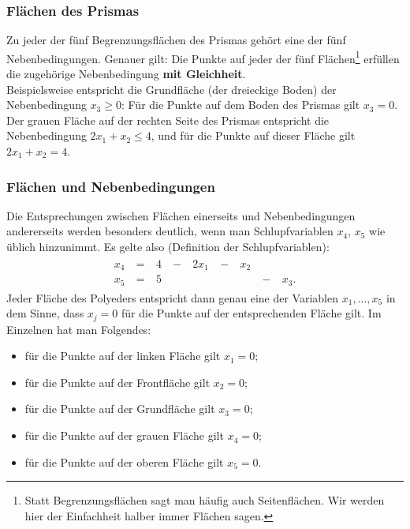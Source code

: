 \documentclass[smaller]{beamer}
\begin{document}
\begin{frame}
 \frametitle{Flächen des Prismas}
 Zu jeder der fünf Begrenzungsflächen des Prismas gehört eine der fünf Nebenbedingungen. Genauer gilt: \alert{Die Punkte auf jeder der fünf Flächen\footnote{Statt {\glqq}Begrenzungsflächen{\grqq} sagt man häufig auch {\glqq}Seitenflächen{\grqq}. Wir werden hier der Einfachheit halber immer {\glqq}Flächen{\grqq} sagen.} erfüllen die zugehörige Nebenbedingung \textbf{mit Gleichheit}}. \\ \vspace*{0.2cm}
Beispielsweise entspricht die Grundfläche (der dreieckige Boden) der Nebenbedingung $x_3 \geq 0$: Für die Punkte auf dem Boden des Prismas gilt $x_3=0$. Der grauen Fläche auf der rechten Seite des Prismas entspricht die Nebenbedingung $2x_1+x_2 \leq 4$, und für die Punkte auf dieser Fläche gilt $2x_1+x_2 = 4$. 
\end{frame}

\begin{frame}
 \frametitle{Flächen und Nebenbedingungen}
 Die Entsprechungen zwischen Flächen einerseits und Nebenbedingungen andererseits werden besonders deutlich, wenn man \alert{Schlupfvariablen} $x_4$, $x_5$ wie üblich hinzunimmt. Es gelte also (Definition der Schlupfvariablen):
\begin{align*}
\begin{alignedat}{5}
x_4 &\ = &\ 4 &\ - &\ 2x_1 &\ - &\ x_2 &\   &      \\
x_5 &\ = &\ 5 &\   &\      &\   &\     &\ - &\ x_3.
\end{alignedat}
\end{align*}
\alert{Jeder Fläche des Polyeders entspricht dann genau eine der Variablen $x_1,\ldots,x_5$} in dem Sinne, dass $x_j=0$ für die Punkte auf der entsprechenden Fläche gilt. Im Einzelnen hat man Folgendes:
\begin{itemize}
\item für die Punkte auf der linken Fläche gilt $x_1=0$;
\item für die Punkte auf der Frontfläche gilt $x_2=0$;
\item für die Punkte auf der Grundfläche gilt $x_3=0$;
\item für die Punkte auf der grauen Fläche gilt $x_4=0$;
\item für die Punkte auf der oberen Fläche gilt $x_5=0$.
\end{itemize}
\end{frame}
\end{document}

